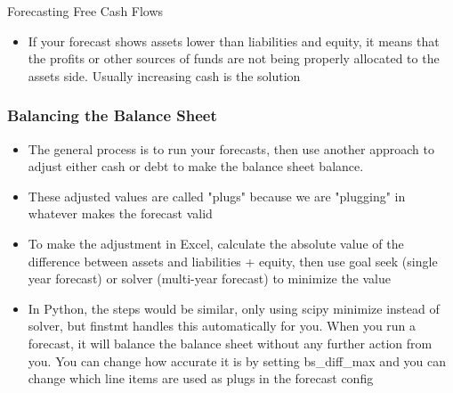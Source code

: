 \documentclass[handout, 11pt]{beamer}
\begin{document}
\begin{section}{Forecasting Free Cash Flows}
\begin{frame}
\begin{itemize}
\vfill
\item If your forecast shows assets lower than liabilities and equity, it means that the profits or other sources of funds are not being properly allocated to the assets side. Usually increasing cash is the solution
\end{itemize}
\end{frame}
\begin{frame}
\frametitle{Balancing the Balance Sheet}
\begin{itemize}
\small
\vfill
\item The general process is to run your forecasts, then use another approach to adjust either cash or debt to make the balance sheet balance. 
\vfill
\item These adjusted values are called "plugs" because we are "plugging" in whatever makes the forecast valid
\vfill
\item To make the adjustment in Excel, calculate the absolute value of the difference between assets and liabilities + equity, then use goal seek (single year forecast) or solver (multi-year forecast) to minimize the value
\vfill
\item In Python, the steps would be similar, only using scipy minimize instead of solver, but finstmt handles this automatically for you. When you run a forecast, it will balance the balance sheet without any further action from you. You can change how accurate it is by setting bs\_diff\_max and you can change which line items are used as plugs in the forecast config
\end{itemize}
\end{frame}
\end{section}
\end{document}
